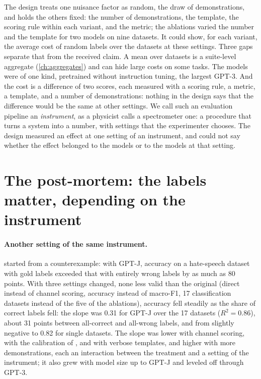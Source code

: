 \begin{refsection}
The design treats one nuisance factor as random, the draw of demonstrations, and holds the others fixed: the number of demonstrations, the template, the scoring rule within each variant, and the metric; the ablations varied the number and the template for two models on nine datasets. It could show, for each variant, the average cost of random labels over the datasets at these settings. Three gaps separate that from the received claim. A mean over datasets is a suite-level aggregate (\cref{ch:aggregates}) and can hide large costs on some tasks. The models were of one kind, pretrained without instruction tuning, the largest GPT-3. And the cost is a difference of two scores, each measured with a scoring rule, a metric, a template, and a number of demonstrations: nothing in the design says that the difference would be the same at other settings. We call such an evaluation pipeline an \emph{instrument}, as a physicist calls a spectrometer one: a procedure that turns a system into a number, with settings that the experimenter chooses. The design measured an effect at one setting of an instrument, and could not say whether the effect belonged to the models or to the models at that setting.

\section{The post-mortem: the labels matter, depending on the instrument}\label{sec:instruments:postmortem}

\paragraph{Another setting of the same instrument.} \Textcite{YooEtAl2022} started from a counterexample: with GPT-J, accuracy on a hate-speech dataset with gold labels exceeded that with entirely wrong labels by as much as 80 points. With three settings changed, none less valid than the original (direct instead of channel scoring, accuracy instead of macro-F1, 17 classification datasets instead of the five of the ablations), accuracy fell steadily as the share of correct labels fell: the slope was 0.31 for GPT-J over the 17 datasets ($R^2=0.86$), about 31 points between all-correct and all-wrong labels, and from slightly negative to 0.82 for single datasets. The slope was lower with channel scoring, with the calibration of \textcite{ZhaoEtAl2021}, and with verbose templates, and higher with more demonstrations, each an interaction between the treatment and a setting of the instrument; it also grew with model size up to GPT-J and leveled off through GPT-3.


\end{refsection}
